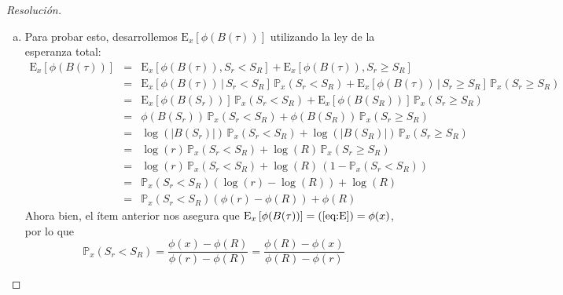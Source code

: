 \documentclass[a4paper,11pt]{article}
\newcommand{\abs}[1]{\ensuremath{\left\lvert #1 \right\rvert}}
\newcommand{\Probx}[2]{\ensuremath{\mathbb{P}_{#1} \left( #2 \right)}}
\newcommand{\Expx}[2]{\ensuremath{\textrm{E}_{#1}\left[#2\right]}}
\newcommand{\ExpxC}[3]{\ensuremath{\textrm{E}_{#1}\left[#2 \, | \, #3\right]}}
\begin{document}
\begin{proof}[Resoluci\'on]
\begin{enumerate}[a.]
    \item Para probar esto, desarrollemos $\Expx{x}{\phi(B(\tau))}$ utilizando la ley
    de la esperanza total:
    \begin{eqnarray}
        \Expx{x}{\phi(B(\tau))}
            &=& \Expx{x}{\phi(B(\tau)), S_r < S_R} + 
                \Expx{x}{\phi(B(\tau)), S_r \geq S_R} \nonumber \\
            &=& \ExpxC{x}{\phi(B(\tau))}{S_r < S_R} \, \Probx{x}{S_r < S_R} +
                \ExpxC{x}{\phi(B(\tau))}{S_r \geq S_R} \, \Probx{x}{S_r \geq S_R} \nonumber \\
            &=& \Expx{x}{\phi(B(S_r))}\, \Probx{x}{S_r < S_R} +
                \Expx{x}{\phi(B(S_R))}\, \Probx{x}{S_r \geq S_R} \nonumber \\
            &=& \phi(B(S_r))\, \Probx{x}{S_r < S_R} +
                \phi(B(S_R))\, \Probx{x}{S_r \geq S_R} \nonumber \\
            &=& \log(\abs{B(S_r)})\, \Probx{x}{S_r < S_R} +
                \log(\abs{B(S_R)})\, \Probx{x}{S_r \geq S_R} \nonumber \\
            &=& \log(r)\, \Probx{x}{S_r < S_R} +
                \log(R)\, \Probx{x}{S_r \geq S_R} \nonumber \\
            &=& \log(r)\, \Probx{x}{S_r < S_R} +
                \log(R)\, (1 - \Probx{x}{S_r < S_R}) \nonumber \\
            &=& \Probx{x}{S_r < S_R} (\log(r) - \log(R)) + \log(R) \nonumber \\
            &=& \Probx{x}{S_r < S_R} (\phi(r) - \phi(R)) + \phi(R) \label{eq:E}
    \end{eqnarray}
    Ahora bien, el ítem anterior nos asegura que $\Expx{x}{\phi(B(\tau))} = (\ref{eq:E}) = \phi(x)$,
    por lo que
    $$\Probx{x}{S_r < S_R} = \frac{\phi(x) - \phi(R)}{\phi(r) - \phi(R)} 
        = \frac{\phi(R) - \phi(x)}{\phi(R) - \phi(r)}$$


\end{enumerate}
\end{proof}
\end{document}
